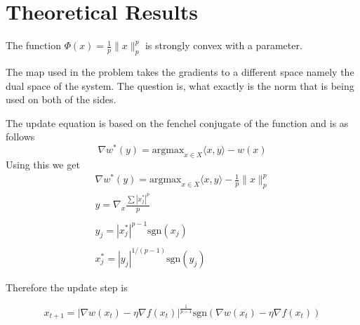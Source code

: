 \section*{Theoretical Results}

The function $\Phi(x) = \frac{1}{p} \| x \|_p^p$ is strongly convex with a parameter.

The map used in the problem takes the gradients to a different space namely the dual space of the system. 
The question is, what exactly is the norm that is being used on both of the sides.

The update equation is based on the fenchel conjugate of the function and is as follows
\begin{equation}
    \nabla w^*(y) = \text{argmax}_{x \in X} \langle x, y \rangle - w(x)
\end{equation}
Using this we get 
\begin{gather*}
    \nabla w^*(y) = \text{argmax}_{x \in X} \langle x, y \rangle - \frac{1}{p} \| x \|_p^p 
    \\
    y = \nabla_x \frac{\sum |x^*_j|^p}{p} \\
    \\
    y_j = |x^*_j|^{p-1} \text{sgn}(x_j) \\
    \\
    x_j^* = |y_j|^{1/(p-1)} \text{sgn}(y_j)
\end{gather*}

Therefore the update step is 

\begin{equation}
\label{eq:mirror_descent}
    x_{t+1} =  | \nabla w(x_t) - \eta \nabla f(x_t) |^{\frac{1}{p-1}} \text{sgn}(\nabla w(x_t) - \eta \nabla f(x_t))
\end{equation}
